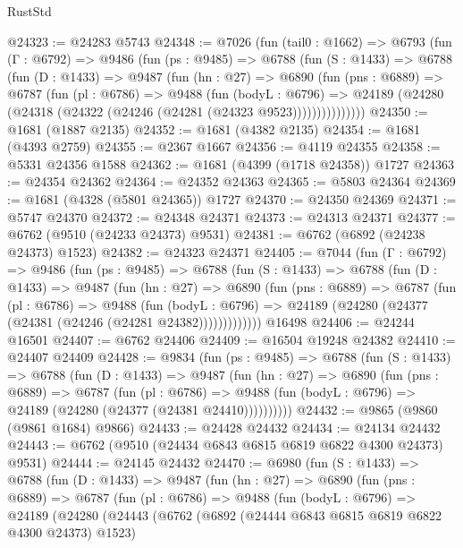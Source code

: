 \begin{lexlean}{RustStd}
\begin{coremodule}
@24323 := @24283 @5743
@24348 := @7026
    (fun (tail0 : @1662) =>
    @6793
      (fun (Γ : @6792) =>
      @9486
        (fun (ps : @9485) =>
        @6788
          (fun (S : @1433) =>
          @6788
            (fun (D : @1433) =>
            @9487
              (fun (hn : @27) =>
              @6890
                (fun (pns : @6889) =>
                @6787
                  (fun (pl : @6786) =>
                  @9488
                    (fun (bodyL : @6796) =>
                    @24189 (@24280 (@24318 (@24322 (@24246 (@24281 (@24323 @9523)))))))))))))))
@24350 := @1681 (@1887 @2135)
@24352 := @1681 (@4382 @2135)
@24354 := @1681 (@4393 @2759)
@24355 := @2367 @1667
@24356 := @4119 @24355
@24358 := @5331 @24356 @1588
@24362 := @1681 (@4399 (@1718 @24358)) @1727
@24363 := @24354 @24362
@24364 := @24352 @24363
@24365 := @5803 @24364
@24369 := @1681 (@4328 (@5801 @24365)) @1727
@24370 := @24350 @24369
@24371 := @5747 @24370
@24372 := @24348 @24371
@24373 := @24313 @24371
@24377 := @6762 (@9510 (@24233 @24373) @9531)
@24381 := @6762 (@6892 (@24238 @24373) @1523)
@24382 := @24323 @24371
@24405 := @7044
    (fun (Γ : @6792) =>
    @9486
      (fun (ps : @9485) =>
      @6788
        (fun (S : @1433) =>
        @6788
          (fun (D : @1433) =>
          @9487
            (fun (hn : @27) =>
            @6890
              (fun (pns : @6889) =>
              @6787
                (fun (pl : @6786) =>
                @9488
                  (fun (bodyL : @6796) =>
                  @24189 (@24280 (@24377 (@24381 (@24246 (@24281 @24382)))))))))))))
    @16498
@24406 := @24244 @16501
@24407 := @6762 @24406
@24409 := @16504 @19248 @24382
@24410 := @24407 @24409
@24428 := @9834
    (fun (ps : @9485) =>
    @6788
      (fun (S : @1433) =>
      @6788
        (fun (D : @1433) =>
        @9487
          (fun (hn : @27) =>
          @6890
            (fun (pns : @6889) =>
            @6787
              (fun (pl : @6786) =>
              @9488 (fun (bodyL : @6796) => @24189 (@24280 (@24377 (@24381 @24410))))))))))
@24432 := @9865 (@9860 (@9861 @1684) @9866)
@24433 := @24428 @24432
@24434 := @24134 @24432
@24443 := @6762 (@9510 (@24434 @6843 @6815 @6819 @6822 @4300 @24373) @9531)
@24444 := @24145 @24432
@24470 := @6980
    (fun (S : @1433) =>
    @6788
      (fun (D : @1433) =>
      @9487
        (fun (hn : @27) =>
        @6890
          (fun (pns : @6889) =>
          @6787
            (fun (pl : @6786) =>
            @9488
              (fun (bodyL : @6796) =>
              @24189
                (@24280
                  (@24443
                    (@6762
                      (@6892 (@24444 @6843 @6815 @6819 @6822 @4300 @24373) @1523)

\end{coremodule}
\end{lexlean}
